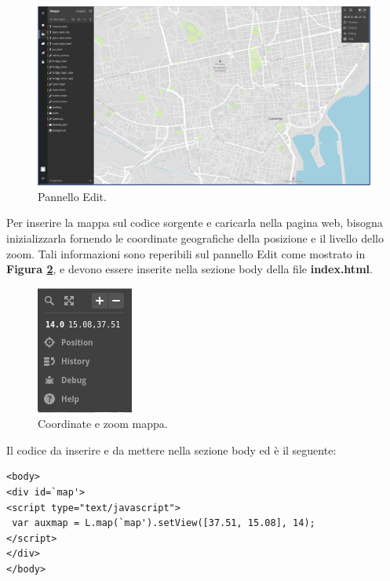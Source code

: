 \documentclass[a4paper,11pt]{article}
\begin{document}
\begin{figure}[ht]
	\centering
	\includegraphics[scale=0.26]{Edit.png}
	\caption{Pannello Edit.}
	\label{fig:7}
\end{figure}\newpage		
Per inserire la mappa sul codice sorgente e caricarla nella pagina web, bisogna inizializzarla fornendo le coordinate geografiche della posizione e il livello dello zoom. Tali informazioni sono reperibili sul pannello Edit come mostrato in  \textbf{Figura \ref{fig:8}}, e devono essere inserite nella sezione body della file \textbf{index.html}.
\begin{figure}[htbp]
	\centering
	\includegraphics[scale=1]{coordinate.png}
	\caption{Coordinate e zoom mappa.}
	\label{fig:8}
\end{figure}\newline

Il codice da inserire e da mettere nella sezione body ed è il seguente:

\begin{lstlisting}[style=htmlcssjs]
<body>		
<div id=`map'>
<script type="text/javascript">
 var auxmap = L.map(`map').setView([37.51, 15.08], 14);
</script>
</div>
</body>
\end{lstlisting}
				
\end{document}
